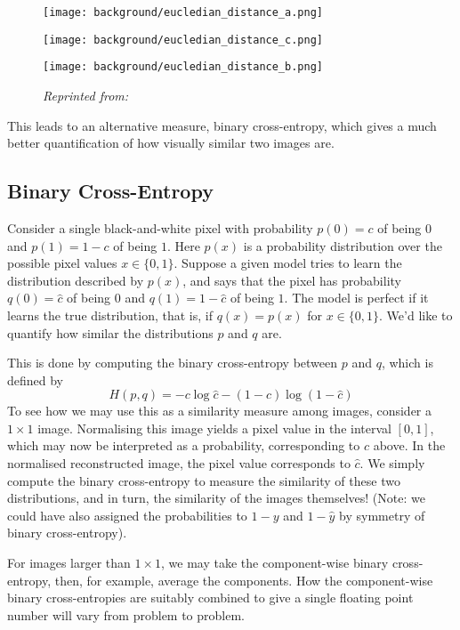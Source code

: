 \begin{figure}[!htb]
\centering
{}
\centering
  \texttt{[image: background/eucledian\_distance\_a.png]}
  \caption{}\label{fig:eucledian_distance_a}
\endminipage\hfill
{}
\centering
  \texttt{[image: background/eucledian\_distance\_c.png]}
  \caption{}\label{fig:eucledian_distance_c}
\endminipage\hfill
{}%
\centering
  \texttt{[image: background/eucledian\_distance\_b.png]}
  \caption{}\label{fig:eucledian_distance_b}
\endminipage
\caption{\textit{Reprinted from:} \cite{Doersch2016}}
\end{figure}

This leads to an alternative measure, binary cross-entropy, which gives a much better quantification of how visually similar two images are.

\subsection{Binary Cross-Entropy}
Consider a single black-and-white pixel with probability $p(0) = c$ of being $0$ and $p(1) = 1 - c$ of being $1$. Here $p(x)$ is a probability distribution over the possible pixel values $x \in \{0, 1\}$. Suppose a given model tries to learn the distribution described by $p(x)$, and says that the pixel has probability $q(0) = \hat{c}$ of being $0$ and $q(1) = 1 - \hat{c}$ of being $1$. The model is perfect if it learns the true distribution, that is, if $q(x) = p(x)$ for $x\in\{0,1\}$. We'd like to quantify how similar the distributions $p$ and $q$ are.

This is done by computing the binary cross-entropy between $p$ and $q$, which is defined by $$H(p,q) = -c\log\hat{c} - (1-c)\log(1-\hat{c})$$ To see how we may use this as a similarity measure among images, consider a $1\times1$ image. Normalising this image yields a pixel value in the interval $[0, 1]$, which may now be interpreted as a probability, corresponding to $c$ above. In the normalised reconstructed image, the pixel value corresponds to $\hat{c}$. We simply compute the binary cross-entropy to measure the similarity of these two distributions, and in turn, the similarity of the images themselves! (Note: we could have also assigned the probabilities to $1-y$ and $1-\hat{y}$ by symmetry of binary cross-entropy).

For images larger than $1 \times 1$, we may take the component-wise binary cross-entropy, then, for example, average the components. How the component-wise binary cross-entropies are suitably combined to give a single floating point number will vary from problem to problem.



